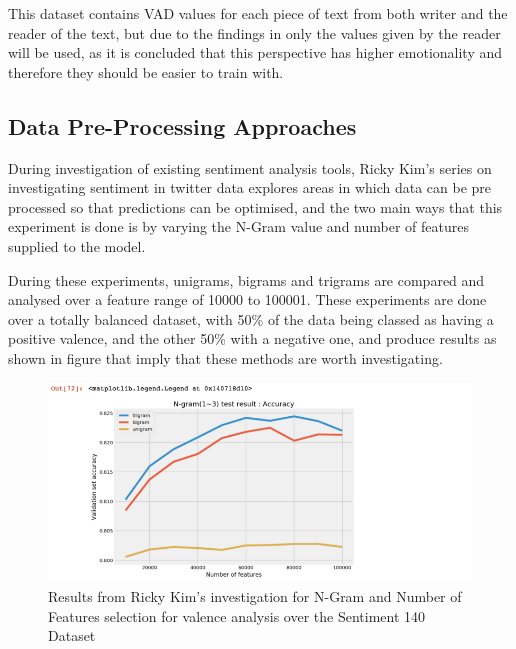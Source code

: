 This dataset contains VAD values for each piece of text from both writer and the reader of the text, but due to the findings in \cite{emoBank} only the values given by the reader will be used, as it is concluded that this perspective has higher emotionality and therefore they should be easier to train with.






\subsection{Data Pre-Processing Approaches}

During investigation of existing sentiment analysis tools, Ricky Kim's series on investigating sentiment in twitter data \cite{towardsDS} explores areas in which data can be pre processed so that predictions can be optimised, and the two main ways that this experiment is done is by varying the N-Gram value and number of features supplied to the model.


During these experiments, unigrams, bigrams and trigrams are compared and analysed over a feature range of 10000 to 100001. These experiments are done over a totally balanced dataset, with 50\% of the data being classed as having a positive valence, and the other 50\% with a negative one, and produce results as shown in figure that imply that these methods are worth investigating.


\begin{figure}[h]
\caption{Results from Ricky Kim's investigation for N-Gram and Number of Features selection for valence analysis over the Sentiment 140 Dataset \cite{go2016sentiment140}}
\centering
\includegraphics[scale=0.5]{litImgs/towardsDSNgramNFeatures.png}
\end{figure}


